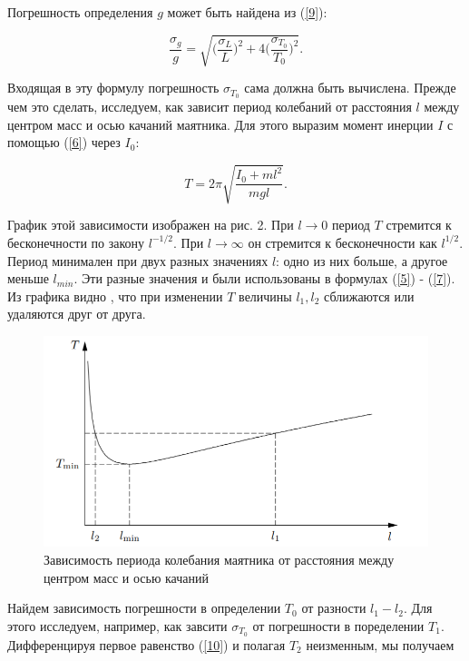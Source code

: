 \documentclass[12pt,a4paper]{article}
\begin{document}
Погрешность определения $g$ может быть найдена из (\ref{9}):

\begin{equation}\label{11}
    \frac{\sigma_g}{g} = \sqrt{\Big(\frac{\sigma_L}{L}\Big)^2 + 4\Big(\frac{\sigma_{T_0}}{T_0}\Big)^2}.
\end{equation}

Входящая в эту формулу погрешность $\sigma_{T_0}$ сама должна быть вычислена. Прежде чем это сделать, исследуем, как зависит период колебаний от расстояния $l$ между центром масс и осью качаний маятника. Для этого выразим момент инерции $I$ с помощью (\ref{6}) через $I_0$:

\begin{equation}\label{12}
    T = 2\pi\sqrt{\frac{I_0 + ml^2}{mgl}}.
\end{equation}

График этой зависимости изображен на рис. 2. При $l \to 0$ период $T$ стремится к бесконечности по закону $l^{-1/2}$. При $l\to\infty$ он стремится к бесконечности как $l^{1/2}$. Период минимален при двух разных значениях $l$: одно из них больше, а другое меньше $l_{min}$. Эти разные значения и были использованы в формулах (\ref{5}) - (\ref{7}). Из графика видно , что при изменении $T$ величины $l_1, l_2$ сближаются или удаляются друг от друга.

\begin{figure}[h!]
\centering
\includegraphics[scale=1]{Image2.png}
\caption{Зависимость периода колебания маятника от расстояния между центром масс и осью качаний}
\label{fig:Image2}
\end{figure}

Найдем зависимость погрешности в определении $T_0$ от разности $l_1-l_2$. Для этого исследуем, например, как завсити $\sigma_{T_0}$ от погрешности в поределении $T_1$. Дифференцируя первое равенство (\ref{10}) и полагая $T_2$ неизменным, мы получаем
\end{document}
